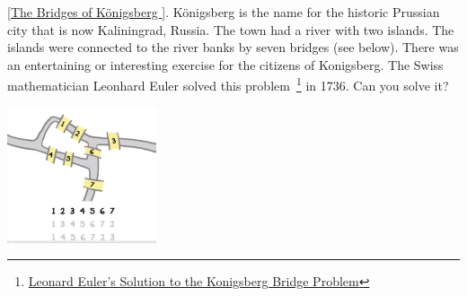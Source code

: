 \documentclass[aspectratio=169]{beamer}
\begin{document}
\begin{frame}[plain]{}

[\href{https://twitter.com/brilliantorg/status/1175031964727959558}{The Bridges of Königsberg }]. 
    K\"{o}nigsberg is the name for the historic Prussian city that is now Kaliningrad, Russia.
    The town had a river with two islands. The islands were connected to the river banks by seven bridges 
    (see below).
     There was an 
entertaining or interesting exercise for the citizens 
of Konigsberg. 
       The Swiss mathematician Leonhard Euler solved this problem~\footnote{
  \href{https://www.maa.org/press/periodicals/convergence/leonard-eulers-solution-to-the-konigsberg-bridge-problem}{Leonard Euler's Solution to the Konigsberg Bridge Problem}}
       in 1736. Can you solve it?
      \begin{center}
     \href{https://twitter.com/brilliantorg/status/1175031964727959558}
        {\includegraphics[height=4cm]{./img/lecture5-fig1.png}}
      \end{center}
     

\end{frame}
\end{document}
